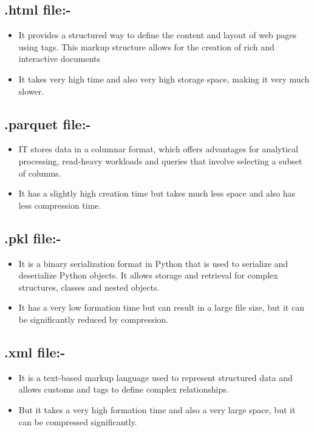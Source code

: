 \documentclass[11pt]{article}
\begin{document}
\subsection{.html file:-}
\begin{itemize}
    \item It provides a structured way to define the content and layout of web pages using tags. This markup structure allows for the creation of rich and interactive documents
    \item It takes very high time and also very high storage space, making it very much slower.
\end{itemize}

\subsection{.parquet file:-}
\begin{itemize}
    \item IT stores data in a columnar format, which offers advantages for analytical processing, read-heavy workloads and queries that involve selecting a subset of columns.
    \item It has a slightly high creation time but takes much less space and also has less compression time.
\end{itemize}

\subsection{.pkl file:-}
\begin{itemize}
    \item It is a binary serialization format in Python that is used to serialize and deserialize Python objects. It allows storage and retrieval for complex structures, classes and nested objects.
    \item It has a very low formation time but can result in a large file size, but it can be significantly reduced by compression.
\end{itemize}

\subsection{.xml file:-}
\begin{itemize}
    \item It is a text-based markup language used to represent structured data and allows customs and tags to define complex relationships.
    \item But it takes a very high formation time and also a very large space, but it can be compressed significantly.
\end{itemize}
\end{document}
